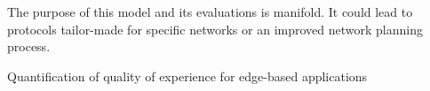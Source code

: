 The purpose of this model and its evaluations is manifold. It could lead to protocols tailor-made for specific networks or an improved network planning process.








  


  





Quantification of quality of experience for edge-based applications\cite{hossfeld2007quantification}

  

    
  
  
